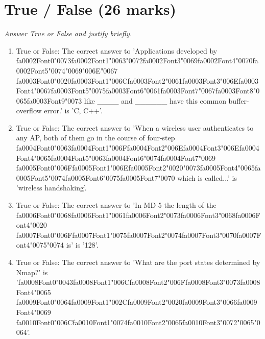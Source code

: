 \documentclass[12pt]{article}
\begin{document}
\section*{True / False (26 marks)}
\textit{Answer True or False and justify briefly.}
\begin{enumerate}[label=\arabic*.]
\item True or False: The correct answer to 'Applications developed by {\csname fa0002Font0\endcsname\char"0073}{\csname fa0002Font1\endcsname\char"0063}{\char"0072}{\csname fa0002Font3\endcsname\char"0069}{\csname fa0002Font4\endcsname\char"0070}{\csname fa0002Font5\endcsname\char"0074}{\char"0069}{\char"006E}{\char"0067} {\csname fa0003Font0\endcsname\char"0020}{\csname fa0003Font1\endcsname\char"006C}{\csname fa0003Font2\endcsname\char"0061}{\csname fa0003Font3\endcsname\char"006E}{\csname fa0003Font4\endcsname\char"0067}{\csname fa0003Font5\endcsname\char"0075}{\csname fa0003Font6\endcsname\char"0061}{\csname fa0003Font7\endcsname\char"0067}{\csname fa0003Font8\endcsname\char"0065}{\csname fa0003Font9\endcsname\char"0073} like \_\_\_\_ and \_\_\_\_\_\_ have this common buffer-overflow error.' is 'C, C++'.
\item True or False: The correct answer to 'When a wireless user authenticates to any AP, both of them go in the course of four-step {\csname fa0004Font0\endcsname\char"0063}{\csname fa0004Font1\endcsname\char"006F}{\csname fa0004Font2\endcsname\char"006E}{\csname fa0004Font3\endcsname\char"006E}{\csname fa0004Font4\endcsname\char"0065}{\csname fa0004Font5\endcsname\char"0063}{\csname fa0004Font6\endcsname\char"0074}{\csname fa0004Font7\endcsname\char"0069} {\csname fa0005Font0\endcsname\char"006F}{\csname fa0005Font1\endcsname\char"006E}{\csname fa0005Font2\endcsname\char"0020}{\char"0073}{\csname fa0005Font4\endcsname\char"0065}{\csname fa0005Font5\endcsname\char"0074}{\csname fa0005Font6\endcsname\char"0075}{\csname fa0005Font7\endcsname\char"0070} which is called...' is 'wireless handshaking'.
\item True or False: The correct answer to 'In MD-5 the length of the {\csname fa0006Font0\endcsname\char"0068}{\csname fa0006Font1\endcsname\char"0061}{\csname fa0006Font2\endcsname\char"0073}{\csname fa0006Font3\endcsname\char"0068}{\csname fa0006Font4\endcsname\char"0020} {\csname fa0007Font0\endcsname\char"006F}{\csname fa0007Font1\endcsname\char"0075}{\csname fa0007Font2\endcsname\char"0074}{\csname fa0007Font3\endcsname\char"0070}{\csname fa0007Font4\endcsname\char"0075}{\char"0074} is' is '128'.
\item True or False: The correct answer to 'What are the port states determined by Nmap?' is '{\csname fa0008Font0\endcsname\char"0043}{\csname fa0008Font1\endcsname\char"006C}{\csname fa0008Font2\endcsname\char"006F}{\csname fa0008Font3\endcsname\char"0073}{\csname fa0008Font4\endcsname\char"0065} {\csname fa0009Font0\endcsname\char"0064}{\csname fa0009Font1\endcsname\char"002C}{\csname fa0009Font2\endcsname\char"0020}{\csname fa0009Font3\endcsname\char"0066}{\csname fa0009Font4\endcsname\char"0069} {\csname fa0010Font0\endcsname\char"006C}{\csname fa0010Font1\endcsname\char"0074}{\csname fa0010Font2\endcsname\char"0065}{\csname fa0010Font3\endcsname\char"0072}{\char"0065}{\char"0064}'.

\end{enumerate}
\end{document}
